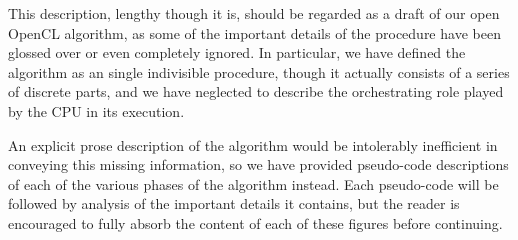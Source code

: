 \documentclass[12pt,twoside]{reedthesis}
\begin{document}
This description, lengthy though it is, should be regarded as a draft of our open OpenCL algorithm, as some of the important details of the procedure have been glossed over or even completely ignored. In particular, we have defined the algorithm as an single indivisible procedure, though it actually consists of a series of discrete parts, and we have neglected to describe the orchestrating role played by the CPU in its execution.

An explicit prose description of the algorithm would be intolerably inefficient in conveying this missing information, so we have provided pseudo-code descriptions of each of the various phases of the algorithm  instead. Each pseudo-code will be followed by analysis of the important details it contains, but the reader is encouraged to fully absorb the content of each of these figures before continuing.
\end{document}
